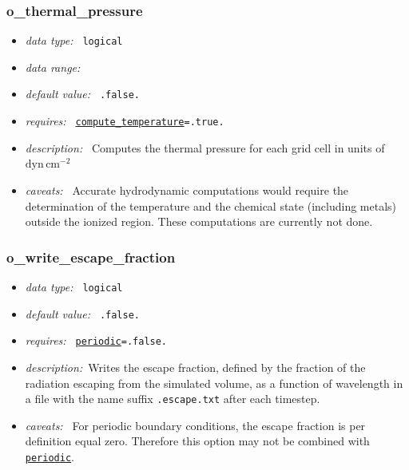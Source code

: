 \documentclass[a4paper,10pt]{article}
\begin{document}
\subsubsection{o\_thermal\_pressure}
\label{opt:othermalpressure}
\begin{itemize}
 \item \textit{data type:~} \texttt{logical}
 \item \textit{data range:~}
 \item \textit{default value:~} \texttt{.false.}
 \item \textit{requires:~} \texttt{\hyperref[opt:periodic]{compute\_temperature}=.true.}
 \item \textit{description:~} Computes the thermal pressure for each grid cell 
  in units of $\mathrm{dyn\,cm^{-2}}$ 
 \item \textit{caveats:~} Accurate hydrodynamic computations would require the 
  determination of the temperature and the chemical state (including metals) 
  outside the ionized region. These computations are currently not done.
\end{itemize}


\subsubsection{o\_write\_escape\_fraction}
\label{opt:owriteescapefraction}
\begin{itemize}
 \item \textit{data type:~} \texttt{logical}
 \item \textit{default value:~} \texttt{.false.}
 \item \textit{requires:~} \texttt{\hyperref[opt:periodic]{periodic}=.false.}
 \item \textit{description:~}Writes the escape fraction, defined by the fraction 
  of the radiation escaping from the simulated volume, as a function of 
  wavelength in a file with the name suffix \texttt{.escape.txt} after each 
  timestep.
 \item \textit{caveats:~} For periodic boundary conditions, the escape fraction  
  is per definition equal zero. Therefore this option may not be combined with 
  \texttt{\hyperref[opt:periodic]{periodic}}.
\end{itemize}
\end{document}
